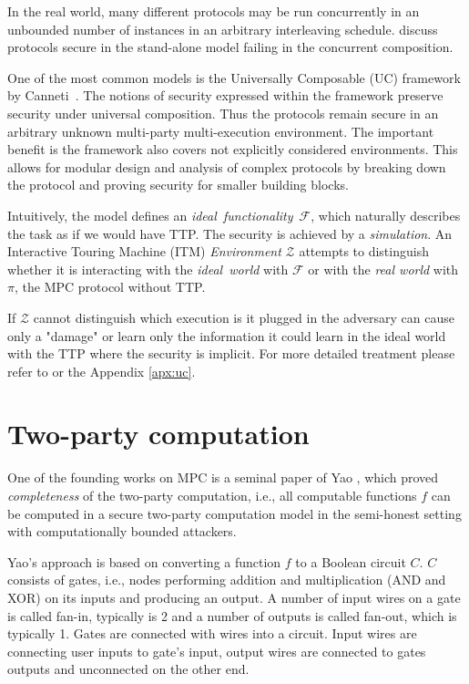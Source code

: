 \documentclass[
  digital, %
  twoside, %
  table,   %
  lof,     %
  lot,     %
]{fithesis3}
\newcounter{ph4_show_guides}
\theoremstyle{definition}
\theoremstyle{remark}
\begin{document}
In the real world, many different protocols may be run concurrently in an unbounded number of instances in an arbitrary interleaving schedule. \cite{Can06, Can13} discuss protocols secure in the stand-alone model failing in the concurrent composition.

One of the most common models is the Universally Composable (UC) framework by Canneti~\cite{Can01}. The notions of security expressed within the framework preserve security under universal composition. Thus the protocols remain secure in an arbitrary unknown multi-party multi-execution environment. The important benefit is the framework also covers not explicitly considered environments. This allows for modular design and analysis of complex protocols by breaking down the protocol and proving security for smaller building blocks.

Intuitively, the model defines an \emph{ideal~functionality}~$\mathcal{F}$, which naturally describes the task as if we would have TTP. The security is achieved by a \emph{simulation}. An Interactive Touring Machine (ITM) \emph{Environment} $\mathcal{Z}$ attempts to distinguish whether it is interacting with the \emph{ideal~world} with $\mathcal{F}$ or with the \emph{real world} with $\pi$, the MPC protocol without TTP. 

If $\mathcal{Z}$ cannot distinguish which execution is it plugged in the adversary can cause only a "damage" or learn only the information it could learn in the ideal world with the TTP where the security is implicit. For more detailed treatment please refer to \cite{Can01, CLOS02, Lin03, G09, CDN15, Lin17} or the Appendix \ref{apx:uc}.

\section{Two-party computation}\label{sec:soa:2pc} %
One of the founding works on MPC is a seminal paper of Yao \cite{Yao86}, which proved \emph{completeness} of the two-party computation, i.e., all computable functions $f$ can be computed in a secure two-party computation model in the semi-honest setting with computationally bounded attackers. 

Yao's approach is based on converting a function $f$ to a Boolean circuit $C$. $C$ consists of gates, i.e., nodes performing addition and multiplication (AND and XOR) on its inputs and producing an output. A number of input wires on a gate is called fan-in, typically is 2 and a number of outputs is called fan-out, which is typically 1. Gates are connected with wires into a circuit. Input wires are connecting user inputs to gate's input, output wires are connected to gates outputs and unconnected on the other end.
\end{document}
